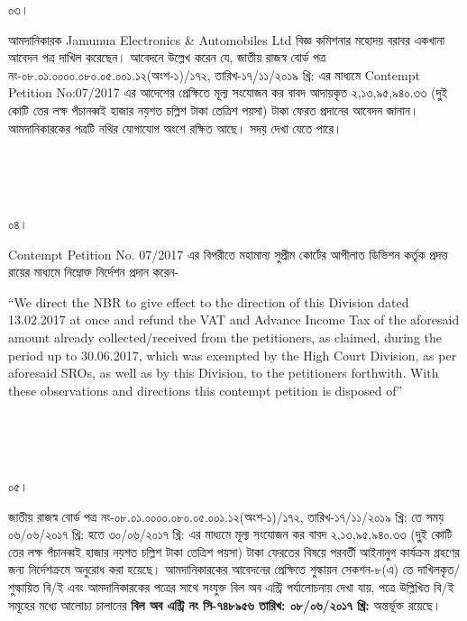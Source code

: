 \documentclass[12pt]{article}
\newcommand{\nbrl}{নং-০৮.০১.০০০০.০৮০.০৫.০০১.১২(অংশ-১)/১৭২, তারিখ-১৭/১১/২০১৯ খ্রি:}
\newcommand{\tvat}{২,১৩,৯৫,৯৪০.৩৩ (দু্ই কোটি তের লক্ষ পঁচানব্বই হাজার নয়শত চল্লিশ টাকা তেত্রিশ পয়সা) টাকা}
\newcommand{\tl}{০৬/০৬/২০১৭ খ্রি: হতে ৩০/০৬/২০১৭ খ্রি:}
\newcommand{\cno}{৭৪৮৯৫৬}
\newcommand{\dt}{০৮/০৬/২০১৭}
\begin{document}
\begin{minipage}[t]{0.05\linewidth}
০৩।
\end{minipage}
\begin{minipage}[t]{1\linewidth}
আমদানিকারক
Jamunua Electronics \& Automobiles Ltd
বিজ্ঞ কমিশনার মহোদয় বরাবর
একখানা আবেদন পত্র দাখিল
করেছেন। আবেদনে উল্লেখ করেন যে,
জাতীয় রাজস্ব বোর্ড পত্র
{\nbrl} এর মাধ্যমে
Contempt Petition No:07/2017
এর আদেশের প্রেক্ষিতে মূল্য সংযোজন কর
বাবদ আদায়কৃত
{\tvat} ফেরত প্রদানের আবেদন জানান।
আমদানিকারকের পত্রটি নথির যোগাযোগ
অংশে রক্ষিত আছে।
সদয় দেখা যেতে পারে।
\end{minipage}
\\
\\
\\
\begin{minipage}[t]{0.05\linewidth}
০৪।
\end{minipage}
\begin{minipage}[t]{1\linewidth}
Contempt Petition No. 07/2017
এর বিপরীতে মহামান্য সুপ্রীম কোর্টের
আপীলাত ডিভিশন কর্তৃক প্রদত্ত রায়ের
মাধ্যমে নিম্নোক্ত নির্দেশন প্রদান করেন-


\hspace{1em}``We direct the NBR
to give effect to the direction
of this Division
dated 13.02.2017
at once and refund the VAT
and Advance Income Tax
of the aforesaid amount already
collected/received from the
petitioners, as claimed, during
the period up to 30.06.2017,
which was exempted by the
High Court Division, as per
aforesaid SROs, as well as by this
Division, to the  petitioners
forthwith. With these observations
and directions this contempt
petition is disposed of''
\end{minipage}
\\
\\
\\
\begin{minipage}[t]{0.05\linewidth}
০৫।
\end{minipage}
\begin{minipage}[t]{1\linewidth}
জাতীয় রাজস্ব বোর্ড পত্র
{\nbrl} তে সময়
{\tl} এর মাধ্যমে মূল্য সংযোজন কর বাবদ
{\tvat} ফেরতের বিষয়ে পরবর্তী
আইনানুগ কার্যক্রম গ্রহণের জন্য
নির্দেশক্রমে অনুরোধ করা হয়েছে।
আমদানিকারকের আবেদনের প্রেক্ষিতে শুল্কায়ন
সেকশন-৮(এ) তে দাখিলকৃত/শুল্কায়িত
বি/ই এবং আমদানিকারকের
পত্রের সাথে সংযুক্ত বিল অব এন্ট্রি
পর্যালোচনায় দেখা যায়,
পত্রে উল্লিখিত বি/ই সমূহের
মধ্যে আলোচ্য চালানের
\textbf{বিল অব এন্ট্রি নং সি-{\cno} তারিখ: {\dt} খ্রি:} অন্তর্ভূক্ত রয়েছে।
\end{minipage}
\end{document}
